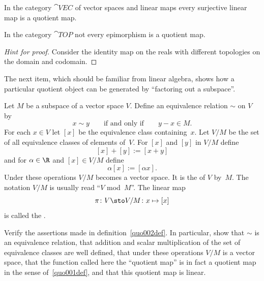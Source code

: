 \begin{exam} In the category $\cat{VEC}$ of vector spaces and linear maps every surjective linear
map is a quotient map.
\end{exam}

\begin{exam}\label{C021734} In the category $\cat{TOP}$ not every epimorphism is a
quotient map.
\end{exam}

\begin{proof}[\emph{Hint for proof}] Consider the identity map on the reals with different
topologies on the domain and codomain. \ns
\end{proof}

The next item, which should be familiar from linear algebra, shows how a particular quotient object can be generated by
``factoring out a subspace''.

\begin{defn}\label{quo002def} Let $M$ be a subspace of a vector space $V$.  Define an
equivalence relation $\sim$ on $V$ by
   \[ x \sim y \qquad \text{if and only if} \qquad y - x \in M. \]
For each $x \in V$ let $[x]$ be the equivalence class containing~$x$.
Let $V/M$ be the set of all equivalence classes of elements of~$V$.  For $[x]$ and $[y]$
in $V/M$ define
  \[ [x] + [y] := [x+y]\]
and for $\alpha \in \R$ and $[x] \in V/M$ define
  \[\alpha[x] := [\alpha x].\]
Under these operations $V/M$ becomes a vector space.  It is the
 of $V$ by~$M$.  The notation $V/M$ is usually read ``$V$ mod~$M$''.
The linear map
  \[ \pi\colon V \sto V/M\colon x \mapsto [x] \]
is called the
.
\end{defn}

\begin{exer} Verify the assertions made in definition~\ref{quo002def}. In particular,
show that $\sim$ is an equivalence relation, that addition and scalar multiplication of
the set of equivalence classes are well defined, that under these operations $V/M$ is a
vector space, that the function called here the ``quotient map'' is in fact a quotient map
in the sense of~\ref{quo001def}, and that this quotient map is linear.
\end{exer}

